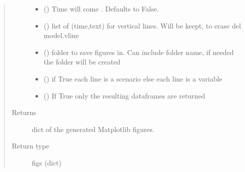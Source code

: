 \documentclass[letterpaper,10pt,english]{sphinxmanual}
\begin{document}
\begin{fulllineitems}
\begin{fulllineitems}
\begin{quote}
\begin{description}
\begin{itemize}
\item {} 
\sphinxAtStartPar
{} (\sphinxstyleliteralemphasis{\sphinxupquote{, }}) \textendash{} Time will come . Defaults to False.

\item {} 
\sphinxAtStartPar
{} (\sphinxstyleliteralemphasis{\sphinxupquote{, }}) \textendash{} list of (time,text) for vertical lines. Will be keept, to erase del model.vline

\item {} 
\sphinxAtStartPar
{} (\sphinxstyleliteralemphasis{\sphinxupquote{,}}) \textendash{} folder to save figures in. Can include folder name, if needed the folder will be created

\item {} 
\sphinxAtStartPar
{} (\sphinxstyleliteralemphasis{\sphinxupquote{,}}) \textendash{} if True each line is a scenario else each line is a variable

\item {} 
\sphinxAtStartPar
{} () \textendash{} If True only the resulting dataframes are returned

\end{itemize}

\item[{Returns}] \leavevmode
\sphinxAtStartPar
dict of the generated Matplotlib figures.

\item[{Return type}] \leavevmode
\sphinxAtStartPar
figs (dict)

\end{description}\end{quote}

\end{fulllineitems}



\end{fulllineitems}
\end{document}

